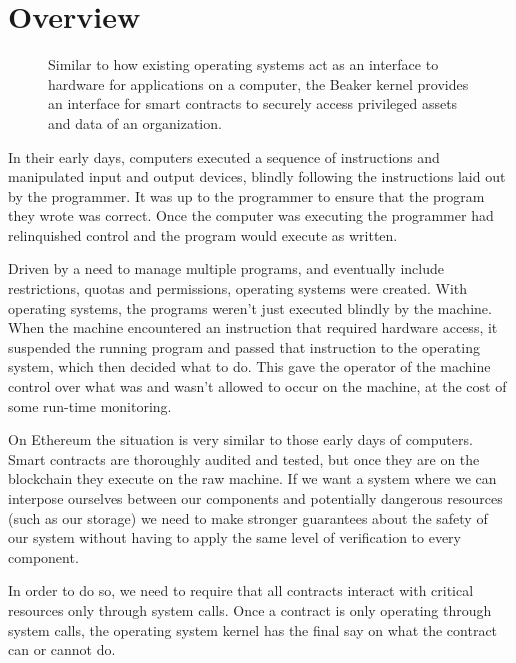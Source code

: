 \documentclass[english,a4paper]{article}
\begin{document}
\section{Overview}\label{overview}

\begin{figure}[H]

    \caption{Similar to how existing operating systems act as an
    interface to hardware for applications on a computer, the Beaker kernel
    provides an interface for smart contracts to securely access privileged
    assets and data of an organization.\label{fig:kernels}}
\end{figure}

In their early days, computers executed a sequence of instructions and
manipulated input and output devices, blindly following the instructions
laid out by the programmer. It was up to the programmer to ensure that
the program they wrote was correct. Once the computer was executing the
programmer had relinquished control and the program would execute as
written.

Driven by a need to manage multiple programs, and eventually include
restrictions, quotas and permissions, operating systems were created.
With operating systems, the programs weren't just executed blindly by
the machine. When the machine encountered an instruction that required
hardware access, it suspended the running program and passed that
instruction to the operating system, which then decided what to do. This
gave the operator of the machine control over what was and wasn't
allowed to occur on the machine, at the cost of some run-time
monitoring.

On Ethereum the situation is very similar to those early days of
computers. Smart contracts are thoroughly audited and tested, but once
they are on the blockchain they execute on the raw machine. If we want a
system where we can interpose ourselves between our components and
potentially dangerous resources (such as our storage) we need to make
stronger guarantees about the safety of our system without having to
apply the same level of verification to every component.

In order to do so, we need to require that all contracts interact with
critical resources only through system calls. Once a contract is only
operating through system calls, the operating system kernel has the
final say on what the contract can or cannot do.
\end{document}

